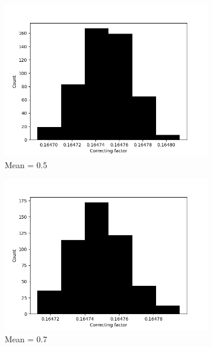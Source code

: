\begin{figure}[!htbp]
\begin{subfigure}[t]{0.45\textwidth}
    \includegraphics[width=1\textwidth]{./images/robust_approx/correcting_factors_hadamard_std_10_05.png}
    \caption{Mean = 0.5}
  \end{subfigure}
  \begin{subfigure}[t]{0.45\textwidth}
    \centering
    \includegraphics[width=1\textwidth]{./images/robust_approx/correcting_factors_hadamard_std_10_07.png}
    \caption{Mean = 0.7}
  \end{subfigure}
  \begin{subfigure}[t]{0.45\textwidth}
    \centering

\end{subfigure}
\end{figure}
